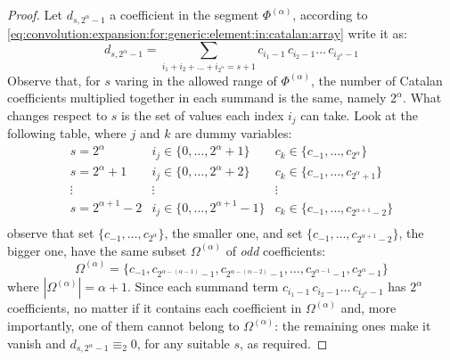 \begin{proof}
Let $d_{s,2^{\alpha}-1}$ a coefficient in the segment $\Phi^{(\alpha)}$, 
according to \autoref{eq:convolution:expansion:for:generic:element:in:catalan:array} 
write it as:
\begin{displaymath}
    d_{s, 2^{\alpha}-1} = \sum_{i_{1}+i_{2}+\ldots+i_{2^{\alpha}}=s+1}
        {c_{i_{1}-1}\,c_{i_{2}-1}\ldots\,c_{i_{2^{\alpha}}-1}}
\end{displaymath}
Observe that, for $s$ varing in the allowed range of $\Phi^{(\alpha)}$,
the number of Catalan coefficients
multiplied together in each summand is the same, namely $2^{\alpha}$. 
What changes respect to $s$ is the set of values 
each index $i_{j}$ can take. Look at the following table, where $j$ and $k$
are dummy variables:
\begin{displaymath}
    \begin{array}{c|c|c}
        s = 2^{\alpha} 
            & i_{j}\in\lbrace0,\ldots,2^{\alpha}+1\rbrace 
            & c_{k}\in\lbrace c_{-1},\ldots,c_{2^{\alpha}}\rbrace\\
        s = 2^{\alpha} +1
            & i_{j}\in\lbrace0,\ldots,2^{\alpha}+2\rbrace 
            & c_{k}\in\lbrace c_{-1},\ldots,c_{2^{\alpha}+1}\rbrace\\
        \vdots & \vdots&\vdots \\
        s = 2^{\alpha+1} -2
            & i_{j}\in\lbrace0,\ldots,2^{\alpha+1}-1\rbrace 
            & c_{k}\in\lbrace c_{-1},\ldots,c_{2^{\alpha+1}-2}\rbrace\\
    \end{array}
\end{displaymath}
observe that set $\lbrace c_{-1},\ldots,c_{2^{\alpha}}\rbrace$, the smaller one, and set
$\lbrace c_{-1},\ldots,c_{2^{\alpha+1}-2}\rbrace$, the bigger one, have the same subset
$\Omega^{(\alpha)}$ of \emph{odd} coefficients: 
\begin{displaymath}
    \Omega^{(\alpha)}=\lbrace c_{-1}, c_{2^{\alpha-(\alpha-1)}-1},c_{2^{\alpha-(\alpha-2)}-1},\ldots, 
        c_{2^{\alpha-1}-1},c_{2^{\alpha}-1}\rbrace
\end{displaymath}
where $\left|\Omega^{(\alpha)}\right|=\alpha+1$.
Since each summand term $c_{i_{1}-1}\,c_{i_{2}-1}\ldots\,c_{i_{2^{\alpha}}-1}$ 
has $2^{\alpha}$ coefficients, no matter if it contains each coefficient in $\Omega^{(\alpha)}$ and,
more importantly, one of them cannot belong to $\Omega^{(\alpha)}$:
the remaining ones make it vanish and $d_{s, 2^{\alpha}-1} \equiv_{2} 0$, for any suitable $s$,
as required.

\end{proof}

